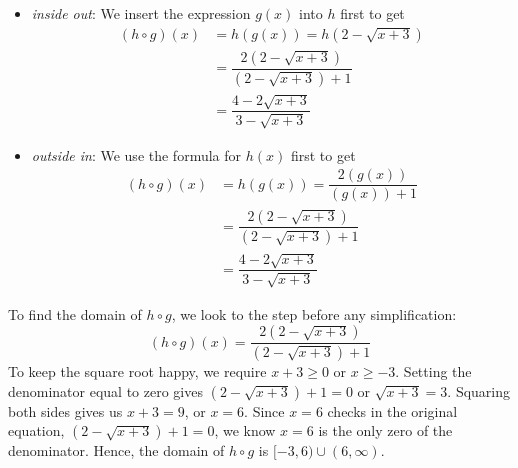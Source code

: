 {\begin{itemize}

\item  \textit{inside out}: We insert the expression $g(x)$ into $h$ first to get
\begin{align*}
(h \circ g)(x) & = h(g(x)) =h\left(2-\sqrt{x+3}\right) \\
 & = \dfrac{2 \left(2-\sqrt{x+3} \right)}{\left(2-\sqrt{x+3}\right)+1}\\
 & = \dfrac{4-2\sqrt{x+3}}{3-\sqrt{x+3}}
  \end{align*}

\item  \textit{outside in}:  We use the formula for $h(x)$ first to get
\begin{align*}
(h \circ g)(x) & = h(g(x)) = \dfrac{2 \left(g(x)\right)}{\left( g(x)\right) + 1}\\
 & = \dfrac{2 \left(2-\sqrt{x+3} \right)}{\left(2-\sqrt{x+3}\right)+1}\\
 & =  \dfrac{4-2\sqrt{x+3}}{3-\sqrt{x+3}}
 \end{align*}
 
 \end{itemize}



To find the domain of $h \circ g$, we look to the step before any simplification:  \[(h \circ g)(x) =  \frac{2 \left(2-\sqrt{x+3} \right)}{\left(2-\sqrt{x+3}\right)+1}\]  To keep the square root happy, we require $x+3 \geq 0$ or $x \geq -3$.  Setting the denominator equal to zero gives $\left(2-\sqrt{x+3}\right)+1=0$ or $\sqrt{x+3} = 3$.  Squaring both sides gives us $x+3=9$, or $x=6$.  Since $x=6$ checks in the original equation, $\left(2-\sqrt{x+3}\right)+1=0$, we know $x=6$ is the only zero of the denominator.  Hence, the domain of $h \circ g$ is $[-3,6) \cup (6, \infty)$.
}



\pagebreak

